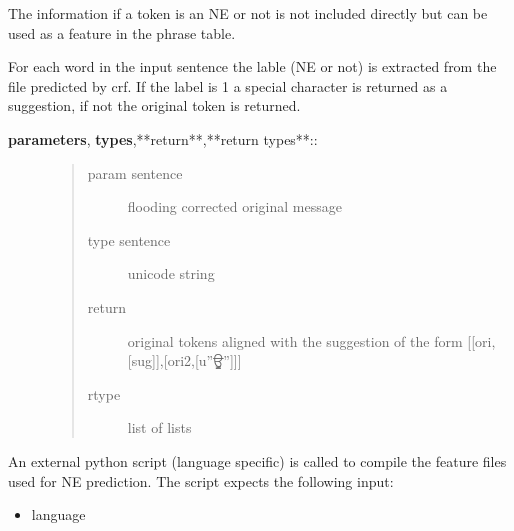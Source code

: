\documentclass[letterpaper,10pt,english]{sphinxmanual}
\begin{document}
\begin{fulllineitems}
\begin{fulllineitems}
\begin{description}
\begin{quote}
\begin{description}
\end{description}\end{quote}

\end{description}

The information if a token is an NE or not is not included directly but can be used as a feature in the phrase table.

\end{fulllineitems}


\begin{fulllineitems}
\label{API:norm.modules.new_NE.New_NE.get_labels}
For each word in the input sentence the lable (NE or not) is extracted from the file predicted by crf.
If the label is 1 a special character is returned as a suggestion, if not the original token is returned.
\begin{description}
\item[{\textbf{parameters}, \textbf{types},**return**,**return types**::}] \leavevmode\begin{quote}\begin{description}
\item[{param sentence}] \leavevmode
flooding corrected original message

\item[{type sentence}] \leavevmode
unicode string

\item[{return}] \leavevmode
original tokens aligned with the suggestion of the form {[}{[}ori,{[}sug{]}{]},{[}ori2,{[}u''ਊ''{]}{]}{]}

\item[{rtype}] \leavevmode
list of lists

\end{description}\end{quote}

\end{description}

\end{fulllineitems}


\begin{fulllineitems}
\label{API:norm.modules.new_NE.New_NE.make_feature_file}
An external python script (language specific) is called to compile the feature files used for NE prediction.
The script expects the following input:
\begin{itemize}
\item {} 
language


\end{itemize}
\end{fulllineitems}
\end{fulllineitems}
\end{document}
